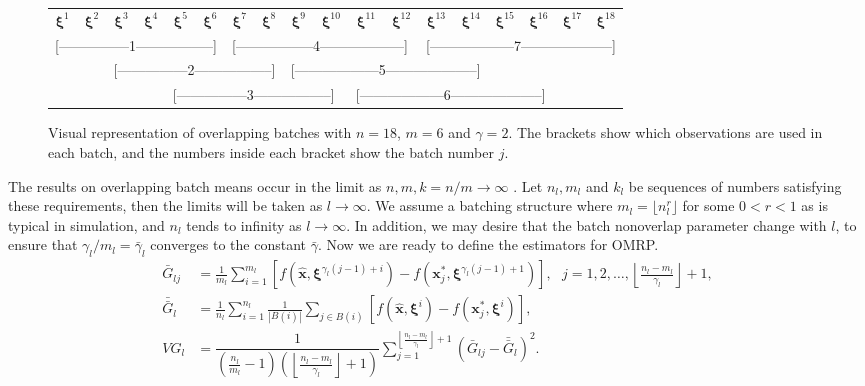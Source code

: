 \documentclass[12pt]{article}
\newcommand{\x}{\mathbf{x}}
\newcommand{\xh}{{\hat{\x}}}
\newcommand{\xs}{\x^*}
\newcommand{\xit}{\boldsymbol{\xi}}
\newcommand{\xiti}{\xit^i}
\newcommand{\nbl}{\left\lfloor\tfrac{n_l-m_l}{\gamma_l}\right\rfloor+1}
\newcommand{\gammab}{\bar{\gamma}}
\newcommand{\gb}{\bar{G}}
\newcommand{\gbb}{\bar{\gb}}
\begin{document}
\begin{figure}[htb!]
	\centering
	\begin{tabular}{*{18}{c}}
		$\xit^1$ & $\xit^2$ & $\xit^3$ & $\xit^4$ & $\xit^5$ & $\xit^6$ & $\xit^7$ & $\xit^8$ & $\xit^9$ & $\xit^{10}$ & $\xit^{11}$ & $\xit^{12}$ & $\xit^{13}$ & $\xit^{14}$ & $\xit^{15}$ & $\xit^{16}$ & $\xit^{17}$  & $\xit^{18}$ \\
		\multicolumn{6}{l}{[---------------1-----------------]} &
		\multicolumn{6}{l}{[-----------------4------------------]} &
		\multicolumn{6}{l}{[------------------7--------------------]} \\
		& & \multicolumn{6}{l}{[---------------2-----------------]} &
		\multicolumn{6}{l}{[------------------5--------------------]} \\
		& & & & \multicolumn{6}{l}{[---------------3-----------------]} &
		\multicolumn{6}{l}{[------------------6--------------------]} \\
	\end{tabular}
	\caption{Visual representation of overlapping batches with $n = 18$, $m = 6$ and $\gamma = 2$.  
        The brackets show which observations are used in each batch, and the numbers inside each bracket show the batch number $j$.}
	\label{fig:overlap_nonint}
\end{figure}

The results on overlapping batch means occur in the limit as $n, m, k=n/m \rightarrow \infty$ \citep{damerdji1994strong,damerdji1995mean,Meketon1984,Song1992,Welch1987}.  
Let $n_l, m_l$ and $k_l$ be sequences of numbers satisfying these requirements, then the limits will be taken as $l \rightarrow \infty$.  
We assume a batching structure where $m_l = \lfloor n_l ^r \rfloor$ for some $0<r<1$ as is typical in simulation, and $n_l$ tends to infinity as $l \rightarrow \infty$.  
In addition, we may desire that the batch nonoverlap parameter change with $l$, to ensure that $\gamma_l / m_l = \gammab_l$ converges to the constant $\gammab$.  
Now we are ready to define the estimators for OMRP.
\begin{align}
	\gb_{lj} & = \frac{1}{m_l} \sum_{i=1}^{m_l} \left[ f(\xh,\xit^{\gamma_l(j-1)+i}) - f(\xs_j,\xit^{\gamma_l(j-1)+1}) \right],\ \ \ j = 1, 2, \dots, \nbl, \label{eq:gbar} \\
	\gbb_l & = \frac{1}{n_l} \sum_{i=1}^{n_l} \frac{1}{|B(i)|} \sum_{j \in B(i)} \left[ f(\xh,\xiti) - f(\xs_j,\xiti) \right], \label{eq:gbb} \\
	VG_l & = \dfrac{1}{\left( \tfrac{n_l}{m_l} - 1 \right) \left(\nbl\right)} \sum_{j=1}^{\nbl} (\gb_{lj} - \gbb_l)^2. \label{eq:vg}
\end{align}
\end{document}
